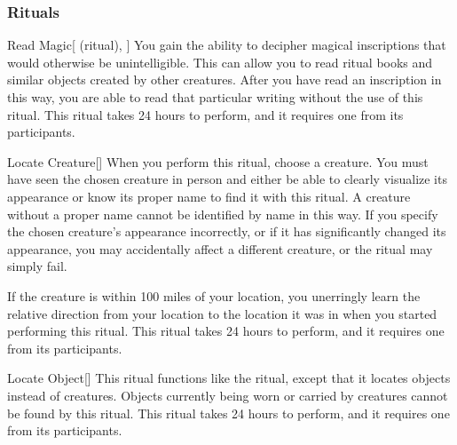 \subsubsection{Rituals}


\lowercase{\hypertarget{spell:Read Magic}{}}\label{spell:Read Magic}
\begin{attuneability}[Rank 1]{\hypertarget{spell:Read Magic}{Read Magic}}[ (ritual), ]
You gain the ability to decipher magical inscriptions that would otherwise be unintelligible.
This can allow you to read ritual books and similar objects created by other creatures.
After you have read an inscription in this way, you are able to read that particular writing without the use of this ritual.
This ritual takes 24 hours to perform, and it requires one  from its participants.
\end{attuneability}
\vspace{0.25em}



\lowercase{\hypertarget{spell:Locate Creature}{}}\label{spell:Locate Creature}
\begin{freeability}[Rank 3]{\hypertarget{spell:Locate Creature}{Locate Creature}}[]
\targetrule
When you perform this ritual, choose a creature.
You must have seen the chosen creature in person and either be able to clearly visualize its appearance or know its proper name to find it with this ritual.
A creature without a proper name cannot be identified by name in this way.
If you specify the chosen creature's appearance incorrectly, or if it has significantly changed its appearance, you may accidentally affect a different creature, or the ritual may simply fail.

If the creature is within 100 miles of your location, you unerringly learn the relative direction from your location to the location it was in when you started performing this ritual.
This ritual takes 24 hours to perform, and it requires one  from its participants.
\end{freeability}
\vspace{0.25em}



\lowercase{\hypertarget{spell:Locate Object}{}}\label{spell:Locate Object}
\begin{freeability}[Rank 3]{\hypertarget{spell:Locate Object}{Locate Object}}[]
\targetrule
This ritual functions like the  ritual, except that it locates objects instead of creatures.
Objects currently being worn or carried by creatures cannot be found by this ritual.
This ritual takes 24 hours to perform, and it requires one  from its participants.
\end{freeability}
\vspace{0.25em}



